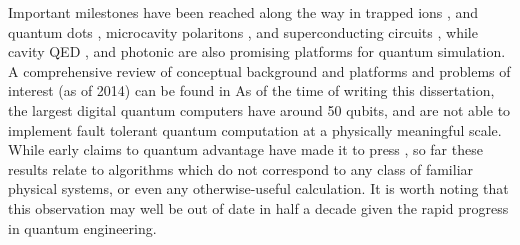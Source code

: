	Important milestones have been reached along the way in trapped ions \cite{Hempel18}, and quantum dots \cite{Hensgens17}, microcavity polaritons \cite{Boulier20}, and superconducting circuits \cite{Wilkinson20}, 
	while cavity QED \cite{Zhu18}, and photonic \cite{Arrazola21} are also promising platforms for quantum simulation.
	A comprehensive review of conceptual background and platforms and problems of interest (as of 2014) can be found in \cite{Georgescu14}
	As of the time of writing this dissertation, the largest digital quantum computers have around 50 qubits, and are not able to implement fault tolerant quantum computation at a physically meaningful scale.
	While early claims to quantum advantage have made it to press \cite{Arute19}, so far these results relate to algorithms which do not correspond to any class of familiar physical systems, or even any otherwise-useful calculation.
	It is worth noting that this observation may well be out of date in half a decade given the rapid progress in quantum engineering.



